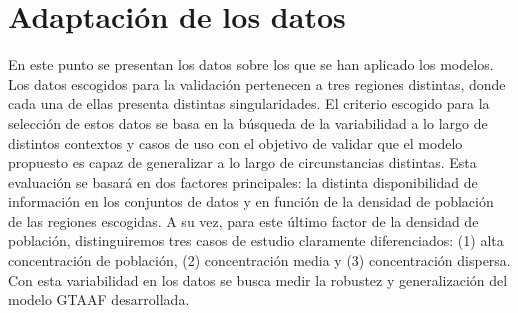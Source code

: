 \documentclass{uathesis-es}
\begin{document}
{			%
			
			
		
		
		
		
		
		
		
		
		\section{Adaptación de los datos}
		\label{DATA_PRESENTATION_RESULTS}
		
		
		En este punto se presentan los datos sobre los que se han aplicado los modelos. Los datos escogidos para la validación pertenecen a tres regiones distintas, donde cada una de ellas presenta distintas singularidades. El criterio escogido para la selección de estos datos se basa en la búsqueda de la variabilidad a lo largo de distintos contextos y casos de uso con el objetivo de validar que el modelo propuesto es capaz de generalizar a lo largo de circunstancias distintas. Esta evaluación se basará en dos factores principales: la distinta disponibilidad de información en los conjuntos de datos y en función de la densidad de población de las regiones escogidas. A su vez, para este último factor de la densidad de población, distinguiremos tres casos de estudio claramente diferenciados: (1) alta concentración de población, (2) concentración media y (3) concentración dispersa. Con esta variabilidad en los datos se busca medir la robustez y generalización del modelo GTAAF desarrollada.
		
}
\end{document}

